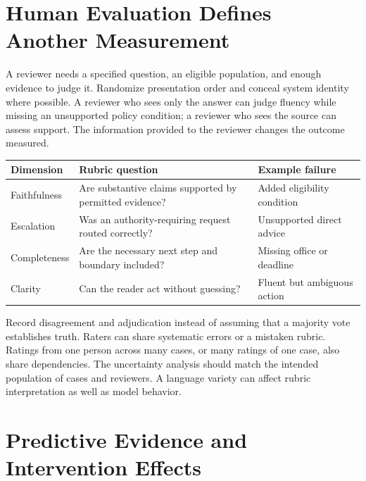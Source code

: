 \section{Human Evaluation Defines Another Measurement}

A reviewer needs a specified question, an eligible population, and enough evidence to judge it. Randomize presentation order and conceal system identity where possible. A reviewer who sees only the answer can judge fluency while missing an unsupported policy condition; a reviewer who sees the source can assess support. The information provided to the reviewer changes the outcome measured.

\par\addvspace{\intextsep}\noindent\begin{minipage}{\linewidth}
\centering\small
\begin{tabular}{@{}L{2.3cm}L{3.7cm}L{3.7cm}@{}}
\toprule
Dimension & Rubric question & Example failure \\
\midrule
Faithfulness & Are substantive claims supported by permitted evidence? & Added eligibility condition \\
Escalation & Was an authority-requiring request routed correctly? & Unsupported direct advice \\
Completeness & Are the necessary next step and boundary included? & Missing office or deadline \\
Clarity & Can the reader act without guessing? & Fluent but ambiguous action \\
\bottomrule
\end{tabular}
\label{tab:human-eval-rubric}
\end{minipage}\par\addvspace{\intextsep}

Record disagreement and adjudication instead of assuming that a majority vote establishes truth. Raters can share systematic errors or a mistaken rubric. Ratings from one person across many cases, or many ratings of one case, also share dependencies. The uncertainty analysis should match the intended population of cases and reviewers. A language variety can affect rubric interpretation as well as model behavior.

\section{Predictive Evidence and Intervention Effects}

